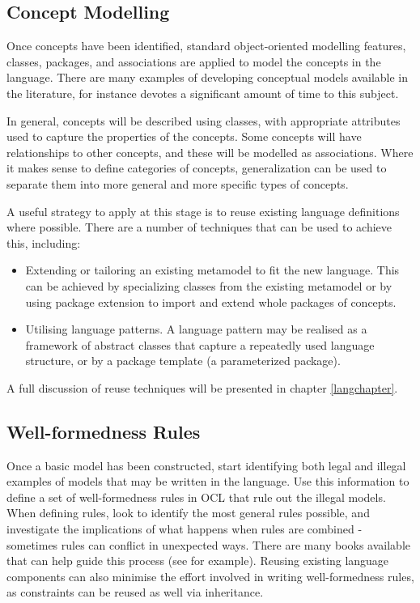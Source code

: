 \subsection{Concept Modelling}

Once concepts have been identified, standard object-oriented
modelling features, classes, packages, and associations are
applied to model the concepts in the language. There are many
examples of developing conceptual models available in the
literature, for instance \cite{larman} devotes a significant
amount of time to this subject.

In general, concepts will be described using classes, with
appropriate attributes used to capture the properties of the
concepts. Some concepts will have relationships to other concepts,
and these will be modelled as associations. Where it makes sense
to define categories of concepts, generalization can be used to
separate them into more general and more specific types of
concepts.

A useful strategy to apply at this stage is to reuse existing
language definitions where possible. There are a number of
techniques that can be used to achieve this, including:

\begin{itemize}
\item Extending or tailoring an existing metamodel to fit the
new language. This can be achieved by specializing classes from the
existing metamodel or by using package extension to import and
extend whole packages of concepts.
\item Utilising language patterns. A language pattern may be realised
as a framework of abstract classes that capture a repeatedly used
language structure, or by a package template (a parameterized package).
\end{itemize}

\noindent A full discussion of reuse techniques will be presented
in chapter \ref{langchapter}.

\subsection{Well-formedness Rules}

Once a basic model has been constructed, start identifying both
legal and illegal examples of models that may be written in the
language. Use this information to define a set of well-formedness
rules in OCL that rule out the illegal models. When defining
rules, look to identify the most general rules possible, and
investigate the implications of what happens when rules are
combined - sometimes rules can conflict in unexpected ways. There
are many books available that can help guide this process (see
\cite{oclBook} for example). Reusing existing language components
can also minimise the effort involved in writing well-formedness
rules, as constraints can be reused as well via inheritance.

